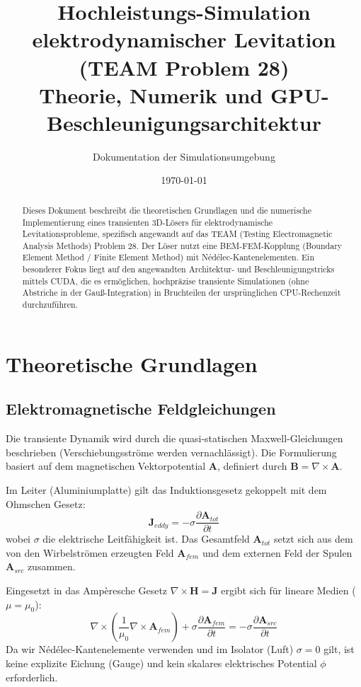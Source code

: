 \documentclass[11pt, a4paper]{article}
\title{\textbf{Hochleistungs-Simulation elektrodynamischer Levitation (TEAM Problem 28)}\\[0.5em] \Large Theorie, Numerik und GPU-Beschleunigungsarchitektur}
\author{Dokumentation der Simulationsumgebung}
\date{\today}
\begin{document}
\maketitle

\begin{abstract}
Dieses Dokument beschreibt die theoretischen Grundlagen und die numerische Implementierung eines transienten 3D-Lösers für elektrodynamische Levitationsprobleme, spezifisch angewandt auf das TEAM (Testing Electromagnetic Analysis Methods) Problem 28. Der Löser nutzt eine BEM-FEM-Kopplung (Boundary Element Method / Finite Element Method) mit Nédélec-Kantenelementen. Ein besonderer Fokus liegt auf den angewandten Architektur- und Beschleunigungstricks mittels CUDA, die es ermöglichen, hochpräzise transiente Simulationen (ohne Abstriche in der Gauß-Integration) in Bruchteilen der ursprünglichen CPU-Rechenzeit durchzuführen.
\end{abstract}

\tableofcontents
\newpage

\section{Theoretische Grundlagen}

\subsection{Elektromagnetische Feldgleichungen}
Die transiente Dynamik wird durch die quasi-statischen Maxwell-Gleichungen beschrieben (Verschiebungsströme werden vernachlässigt). Die Formulierung basiert auf dem magnetischen Vektorpotential $\mathbf{A}$, definiert durch $\mathbf{B} = \nabla \times \mathbf{A}$. 

Im Leiter (Aluminiumplatte) gilt das Induktionsgesetz gekoppelt mit dem Ohmschen Gesetz:
\begin{equation}
    \mathbf{J}_{eddy} = -\sigma \frac{\partial \mathbf{A}_{tot}}{\partial t}
\end{equation}
wobei $\sigma$ die elektrische Leitfähigkeit ist. Das Gesamtfeld $\mathbf{A}_{tot}$ setzt sich aus dem von den Wirbelströmen erzeugten Feld $\mathbf{A}_{fem}$ und dem externen Feld der Spulen $\mathbf{A}_{src}$ zusammen. 

Eingesetzt in das Ampèresche Gesetz $\nabla \times \mathbf{H} = \mathbf{J}$ ergibt sich für lineare Medien ($\mu = \mu_0$):
\begin{equation}
    \nabla \times \left( \frac{1}{\mu_0} \nabla \times \mathbf{A}_{fem} \right) + \sigma \frac{\partial \mathbf{A}_{fem}}{\partial t} = -\sigma \frac{\partial \mathbf{A}_{src}}{\partial t}
    \label{eq:PDE}
\end{equation}
Da wir Nédélec-Kantenelemente verwenden und im Isolator (Luft) $\sigma = 0$ gilt, ist keine explizite Eichung (Gauge) und kein skalares elektrisches Potential $\phi$ erforderlich.
\end{document}
